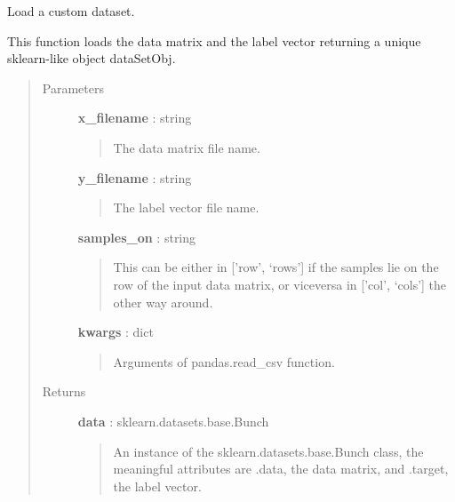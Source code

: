 \documentclass[letterpaper,10pt,english]{sphinxmanual}
\begin{document}
\begin{fulllineitems}
\label{index:adenine.utils.data_source.load_custom}
Load a custom dataset.

This function loads the data matrix and the label vector returning a
unique sklearn-like object dataSetObj.
\begin{quote}\begin{description}
\item[{Parameters}] \leavevmode
\textbf{x\_filename} : string
\begin{quote}

The data matrix file name.
\end{quote}

\textbf{y\_filename} : string
\begin{quote}

The label vector file name.
\end{quote}

\textbf{samples\_on} : string
\begin{quote}

This can be either in {[}'row', `rows'{]} if the samples lie on the row of
the input data matrix, or viceversa in {[}'col', `cols'{]} the other way
around.
\end{quote}

\textbf{kwargs} : dict
\begin{quote}

Arguments of pandas.read\_csv function.
\end{quote}

\item[{Returns}] \leavevmode
\textbf{data} : sklearn.datasets.base.Bunch
\begin{quote}

An instance of the sklearn.datasets.base.Bunch class, the meaningful
attributes are .data, the data matrix, and .target, the label vector.
\end{quote}

\end{description}\end{quote}

\end{fulllineitems}

\end{document}
